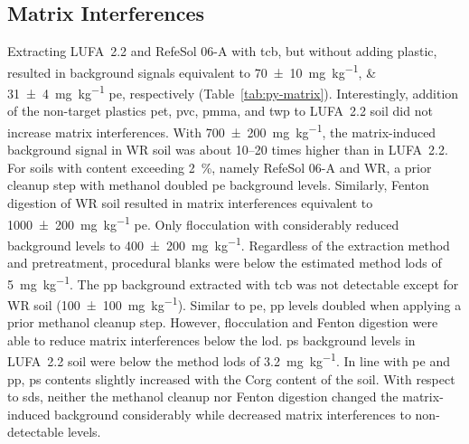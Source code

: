 \subsection{Matrix Interferences}\label{sec:matrix-interferences}

Extracting LUFA~2.2 and RefeSol 06-A with \ac{tcb}, but without adding plastic, resulted in background signals equivalent to \SIlist{70(10);31(4)}{\milli\gram\per\kilo\gram} \ac{pe}, respectively (Table~\ref{tab:py-matrix}). Interestingly, addition of the non-target plastics \ac{pet}, \ac{pvc}, \ac{pmma}, and \ac{twp} to LUFA~2.2 soil did not increase matrix interferences. With \SI{700(200)}{\milli\gram\per\kilo\gram}, the matrix-induced background signal in WR soil was about \numrange{10}{20} times higher than in LUFA~2.2. For soils with  content exceeding \SI{2}{\percent}, namely RefeSol 06-A and WR, a prior cleanup step with methanol doubled \ac{pe} background levels. Similarly, Fenton digestion of WR soil resulted in matrix interferences equivalent to \SI{1000(200)}{\milli\gram\per\kilo\gram} \ac{pe}. Only flocculation with  considerably reduced background levels to \SI{400(200)}{\milli\gram\per\kilo\gram}. Regardless of the extraction method and pretreatment, procedural blanks were below the estimated method \acp{lod} of \SI{5}{\milli\gram\per\kilo\gram}.
The \ac{pp} background extracted with \ac{tcb} was not detectable except for WR soil (\SI{100(100)}{\milli\gram\per\kilo\gram}). Similar to \ac{pe}, \ac{pp} levels doubled when applying a prior methanol cleanup step. However,  flocculation and Fenton digestion were able to reduce matrix interferences below the \ac{lod}.
\Ac{ps} background levels in LUFA~2.2 soil were below the method \acp{lod} of \SI{3.2}{\milli\gram\per\kilo\gram}. In line with \ac{pe} and \ac{pp}, \ac{ps} contents slightly increased with the \ac{Corg} content of the soil. With respect to \acp{sd}, neither the methanol cleanup nor Fenton digestion changed the matrix-induced background considerably while  decreased matrix interferences to non-detectable levels.

